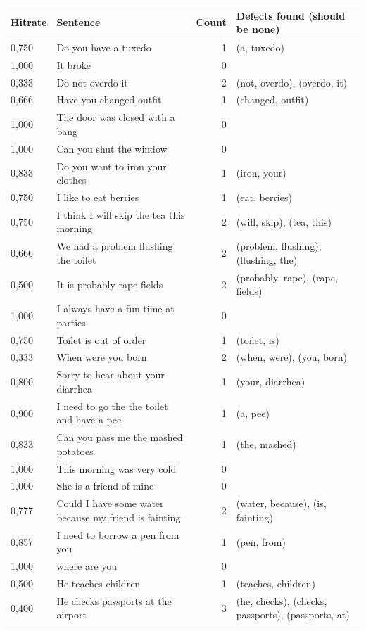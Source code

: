 \documentclass[a4paper,12pt]{article}
\begin{document}
\begin{landscape}
\centering
\begin{longtable}{l l r l}
Hitrate & Sentence & Count & Defects found (should be none) \\
\hline
0,750 & Do you have a tuxedo & 1 & (a, tuxedo) \\
1,000 & It broke & 0 &  \\
0,333 & Do not overdo it & 2 & (not, overdo), (overdo, it) \\
0,666 & Have you changed outfit & 1 & (changed, outfit) \\
1,000 & The door was closed with a bang & 0 &  \\
1,000 & Can you shut the window & 0 &  \\
0,833 & Do you want to iron your clothes & 1 & (iron, your) \\
0,750 & I like to eat berries & 1 & (eat, berries) \\
0,750 & I think I will skip the tea this morning & 2 & (will, skip), (tea, this) \\
0,666 & We had a problem flushing the toilet & 2 & (problem, flushing), (flushing, the) \\
0,500 & It is probably rape fields & 2 & (probably, rape), (rape, fields) \\
1,000 & I always have a fun time at parties & 0 &  \\
0,750 & Toilet is out of order & 1 & (toilet, is) \\
0,333 & When were you born & 2 & (when, were), (you, born) \\
0,800 & Sorry to hear about your diarrhea & 1 & (your, diarrhea) \\
0,900 & I need to go the the toilet and have a pee & 1 & (a, pee) \\
0,833 & Can you pass me the mashed potatoes & 1 & (the, mashed) \\
1,000 & This morning was very cold & 0 &  \\
1,000 & She is a friend of mine & 0 &  \\
0,777 & Could I have some water because my friend is fainting & 2 & (water, because), (is, fainting) \\
0,857 & I need to borrow a pen from you & 1 & (pen, from) \\
1,000 & where are you & 0 &  \\
0,500 & He teaches children & 1 & (teaches, children) \\
0,400 & He checks passports at the airport & 3 & (he, checks), (checks, passports), (passports, at) \\

\end{longtable}
\end{landscape}
\end{document}
